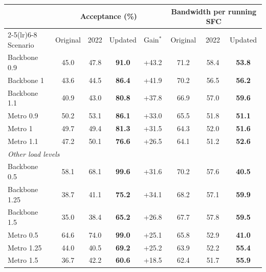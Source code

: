 \begin{tabular}{lccccccc}
\toprule
 & \multicolumn{4}{c}{Acceptance (\%)} & \multicolumn{3}{c}{Bandwidth per running SFC} \\
\cmidrule(lr){2-5}\cmidrule(lr){6-8}
Scenario & Original & 2022 & Updated & Gain$^\ast$ & Original & 2022 & Updated \\
\midrule
Backbone 0.9 & 45.0 & 47.8 & \textbf{91.0} & +43.2 & 71.2 & 58.4 & \textbf{53.8} \\
Backbone 1 & 43.6 & 44.5 & \textbf{86.4} & +41.9 & 70.2 & 56.5 & \textbf{56.2} \\
Backbone 1.1 & 40.9 & 43.0 & \textbf{80.8} & +37.8 & 66.9 & 57.0 & \textbf{59.6} \\
Metro 0.9 & 50.2 & 53.1 & \textbf{86.1} & +33.0 & 65.5 & 51.8 & \textbf{51.1} \\
Metro 1 & 49.7 & 49.4 & \textbf{81.3} & +31.5 & 64.3 & 52.0 & \textbf{51.6} \\
Metro 1.1 & 47.2 & 50.1 & \textbf{76.6} & +26.5 & 64.1 & 51.2 & \textbf{52.6} \\
\midrule \multicolumn{8}{l}{\emph{Other load levels}} \\
Backbone 0.5 & 58.1 & 68.1 & \textbf{99.6} & +31.6 & 70.2 & 57.6 & \textbf{40.5} \\
Backbone 1.25 & 38.7 & 41.1 & \textbf{75.2} & +34.1 & 68.2 & 57.1 & \textbf{59.9} \\
Backbone 1.5 & 35.0 & 38.4 & \textbf{65.2} & +26.8 & 67.7 & 57.8 & \textbf{59.5} \\
Metro 0.5 & 64.6 & 74.0 & \textbf{99.0} & +25.1 & 65.8 & 52.9 & \textbf{41.0} \\
Metro 1.25 & 44.0 & 40.5 & \textbf{69.2} & +25.2 & 63.9 & 52.2 & \textbf{55.4} \\
Metro 1.5 & 36.7 & 42.2 & \textbf{60.6} & +18.5 & 62.4 & 51.7 & \textbf{55.9} \\
\bottomrule
\end{tabular}